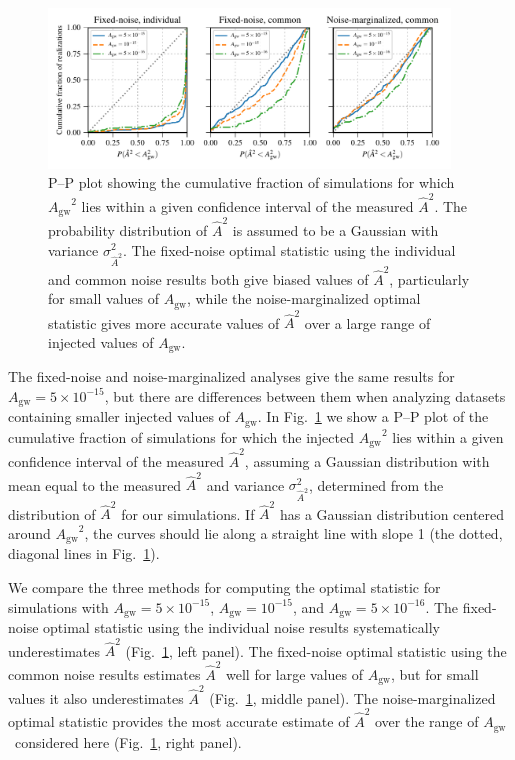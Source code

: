 \documentclass[twocolumn,aps,prd,superscriptaddress]{revtex4-1}
\newcommand{\Agw}{\ensuremath{A_\mathrm{gw}}}
\begin{document}
\begin{figure}[tb]
	\includegraphics[width=0.95\textwidth]{plots/pp_plot.pdf}
	\caption{P--P plot showing the cumulative fraction of simulations for which $\Agw^2$ lies within 
			a given confidence interval of the measured $\hat{A}^2$. 
			The probability distribution of $\hat{A}^2$ is assumed to be a Gaussian 
			with variance $\sigma^2_{\hat{A}^2}$. 
			The fixed-noise optimal statistic using the individual and common noise results 
			both give biased values of $\hat{A}^2$, particularly for small values of \Agw, 
			while the noise-marginalized optimal statistic gives more accurate values of $\hat{A}^2$ 
			over a large range of injected values of \Agw.}
	\label{fig:os_compare}
\end{figure}

The fixed-noise and noise-marginalized analyses give the same results 
for $\Agw = 5\times10^{-15}$, 
but there are differences between them when analyzing datasets 
containing smaller injected values of $\Agw$. 
In Fig.~\ref{fig:os_compare} we show a P--P plot 
of the cumulative fraction of simulations for which the injected $\Agw^2$ lies within 
a given confidence interval of the measured $\hat{A}^2$, 
assuming a Gaussian distribution with mean equal to the measured $\hat{A}^2$ 
and variance $\sigma^2_{\hat{A}^2}$, 
determined from the distribution of $\hat{A}^2$ for our simulations. 
If $\hat{A}^2$ has a Gaussian distribution centered around $\Agw^2$, 
the curves should lie along a straight line with slope 1 (the dotted, diagonal lines in Fig.~\ref{fig:os_compare}).

We compare the three methods for computing the optimal statistic for 
simulations with $\Agw=5\times10^{-15}$, $\Agw=10^{-15}$, and $\Agw=5\times10^{-16}$. 
The fixed-noise optimal statistic using the individual noise results systematically underestimates $\hat{A}^2$ 
(Fig.~\ref{fig:os_compare}, left panel). 
The fixed-noise optimal statistic using the common noise results 
estimates $\hat{A}^2$ well for large values of $\Agw$, but for small values it also underestimates $\hat{A}^2$ 
(Fig.~\ref{fig:os_compare}, middle panel). 
The noise-marginalized optimal statistic provides the most accurate estimate of $\hat{A}^2$ 
over the range of \Agw\ considered here (Fig.~\ref{fig:os_compare}, right panel).
\end{document}
